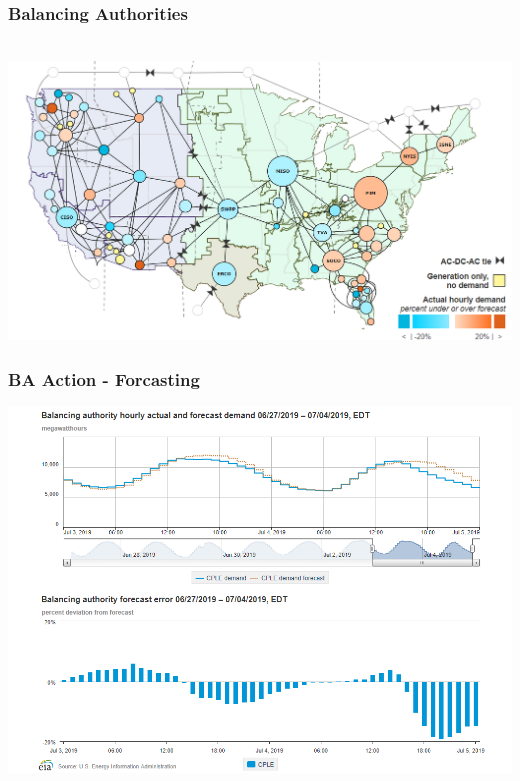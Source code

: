 \documentclass[14pt, unknownkeysallowed]{beamer}
\begin{document}
\begin{frame}
\frametitle{Balancing Authorities}\ \vspace{.5em}
{\centering
\href{https://www.eia.gov/realtime_grid/}%
{\includegraphics[width=.95\linewidth]{BAs}} %
}
\end{frame}
\begin{frame}
\frametitle{BA Action - Forcasting} %
\begin{center}
\includegraphics[height=.85\textheight]{BAforcast} %
\end{center}

\end{frame}
\end{document}
